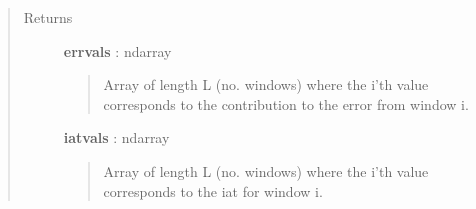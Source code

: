 \documentclass[letterpaper,10pt,english]{sphinxmanual}
\begin{document}
\begin{fulllineitems}
\begin{quote}
\begin{description}
\item[{Returns}] \leavevmode
\textbf{errvals} : ndarray
\begin{quote}

Array of length L (no. windows) where the i'th value corresponds to the contribution to the error from window i.
\end{quote}

\textbf{iatvals} : ndarray
\begin{quote}

Array of length L (no. windows) where the i'th value corresponds to the iat for window i.
\end{quote}

\end{description}\end{quote}

\end{fulllineitems}

\end{document}
